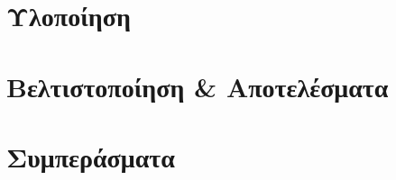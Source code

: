 \documentclass[a4paper,11pt,twoside,openright]{report}
\begin{document}
\chapter{Υλοποίηση}\label{ch:chap5}


\chapter{Βελτιστοποίηση \& Αποτελέσματα}\label{ch:chap6}


\chapter{Συμπεράσματα}\label{ch:chap7}


\newblankpage
\cleardoublepage
{}

\nocite{*}
\printbibliography
{}
\newblankpage


\end{document}
